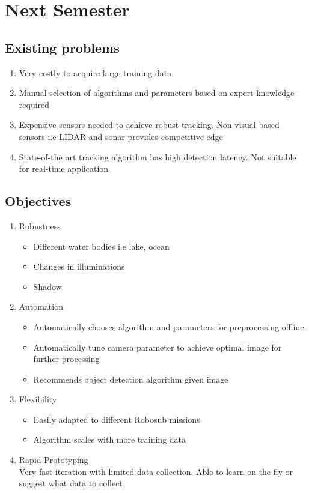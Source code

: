 \chapter{Next Semester}

\section{Existing problems}

\begin{enumerate}
    \item Very costly to acquire large training data
    \item Manual selection of algorithms and parameters based on expert knowledge required
    \item Expensive sensors needed to achieve robust tracking. Non-visual based sensors i.e LIDAR and sonar provides competitive edge
    \item State-of-the art tracking algorithm has high detection latency. Not suitable for real-time application 
\end{enumerate}

\section{Objectives}

\begin{enumerate}
    \item Robustness
        \begin{itemize}
            \item Different water bodies i.e lake, ocean
            \item Changes in illuminations
            \item Shadow
        \end{itemize}
    \item Automation
        \begin{itemize}
            \item Automatically chooses algorithm and parameters for preprocessing offline
            \item Automatically tune camera parameter to achieve optimal image for further processing
            \item Recommends object detection algorithm given image
        \end{itemize}
    \item Flexibility
        \begin{itemize}
            \item Easily adapted to different Robosub missions
            \item Algorithm scales with more training data
        \end{itemize}
    \item Rapid Prototyping \\
        Very fast iteration with limited data collection. Able to learn on the fly or suggest what data to collect
\end{enumerate}

